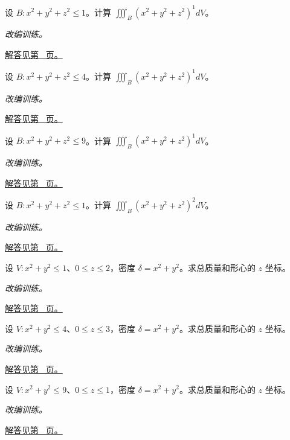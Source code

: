 \documentclass[UTF8,12pt,a4paper,fontset=fandol]{ctexart}
\begin{document}
\begin{example}[球内的径向积分]\label{ex:c38q15}
设 $B:x^2+y^2+z^2\le 1$。计算 $\displaystyle\iiint_B(x^2+y^2+z^2)^{1}dV$。
\par\textit{改编训练。}\par\hyperref[ans:c38q15]{解答见第~\pageref{ans:c38q15} 页。}
\end{example}
\begin{example}[球内的径向积分]\label{ex:c38q16}
设 $B:x^2+y^2+z^2\le 4$。计算 $\displaystyle\iiint_B(x^2+y^2+z^2)^{1}dV$。
\par\textit{改编训练。}\par\hyperref[ans:c38q16]{解答见第~\pageref{ans:c38q16} 页。}
\end{example}
\begin{example}[球内的径向积分]\label{ex:c38q17}
设 $B:x^2+y^2+z^2\le 9$。计算 $\displaystyle\iiint_B(x^2+y^2+z^2)^{1}dV$。
\par\textit{改编训练。}\par\hyperref[ans:c38q17]{解答见第~\pageref{ans:c38q17} 页。}
\end{example}
\begin{example}[球内的径向积分]\label{ex:c38q18}
设 $B:x^2+y^2+z^2\le 1$。计算 $\displaystyle\iiint_B(x^2+y^2+z^2)^{2}dV$。
\par\textit{改编训练。}\par\hyperref[ans:c38q18]{解答见第~\pageref{ans:c38q18} 页。}
\end{example}
\begin{example}[圆柱体内的径向质量]\label{ex:c38q19}
设 $V:x^2+y^2\le 1$、$0\le z\le 2$，密度 $\delta=x^2+y^2$。求总质量和形心的 $z$ 坐标。
\par\textit{改编训练。}\par\hyperref[ans:c38q19]{解答见第~\pageref{ans:c38q19} 页。}
\end{example}
\begin{example}[圆柱体内的径向质量]\label{ex:c38q20}
设 $V:x^2+y^2\le 4$、$0\le z\le 3$，密度 $\delta=x^2+y^2$。求总质量和形心的 $z$ 坐标。
\par\textit{改编训练。}\par\hyperref[ans:c38q20]{解答见第~\pageref{ans:c38q20} 页。}
\end{example}
\begin{example}[圆柱体内的径向质量]\label{ex:c38q21}
设 $V:x^2+y^2\le 9$、$0\le z\le 1$，密度 $\delta=x^2+y^2$。求总质量和形心的 $z$ 坐标。
\par\textit{改编训练。}\par\hyperref[ans:c38q21]{解答见第~\pageref{ans:c38q21} 页。}
\end{example}
\end{document}

